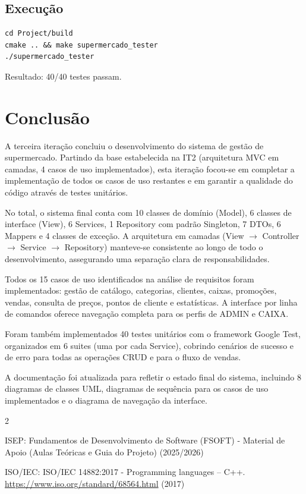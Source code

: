 \documentclass[a4paper]{llncs}
\begin{document}
\subsection{Execução}

\begin{verbatim}
cd Project/build
cmake .. && make supermercado_tester
./supermercado_tester
\end{verbatim}

Resultado: 40/40 testes passam.

\section{Conclusão}
A terceira iteração concluiu o desenvolvimento do sistema de gestão de supermercado. Partindo da base estabelecida na IT2 (arquitetura MVC em camadas, 4 casos de uso implementados), esta iteração focou-se em completar a implementação de todos os casos de uso restantes e em garantir a qualidade do código através de testes unitários.

No total, o sistema final conta com 10 classes de domínio (Model), 6 classes de interface (View), 6 Services, 1 Repository com padrão Singleton, 7 DTOs, 6 Mappers e 4 classes de exceção. A arquitetura em camadas (View $\rightarrow$ Controller $\rightarrow$ Service $\rightarrow$ Repository) manteve-se consistente ao longo de todo o desenvolvimento, assegurando uma separação clara de responsabilidades.

Todos os 15 casos de uso identificados na análise de requisitos foram implementados: gestão de catálogo, categorias, clientes, caixas, promoções, vendas, consulta de preços, pontos de cliente e estatísticas. A interface por linha de comandos oferece navegação completa para os perfis de ADMIN e CAIXA.

Foram também implementados 40 testes unitários com o framework Google Test, organizados em 6 suites (uma por cada Service), cobrindo cenários de sucesso e de erro para todas as operações CRUD e para o fluxo de vendas.

A documentação foi atualizada para refletir o estado final do sistema, incluindo 8 diagramas de classes UML, diagramas de sequência para os casos de uso implementados e o diagrama de navegação da interface.

\begin{thebibliography}{2}

ISEP: Fundamentos de Desenvolvimento de Software (FSOFT) - Material de Apoio (Aulas Teóricas e Guia do Projeto) (2025/2026)

ISO/IEC: ISO/IEC 14882:2017 - Programming languages -- C++. \url{https://www.iso.org/standard/68564.html} (2017)

\end{thebibliography}
\end{document}
